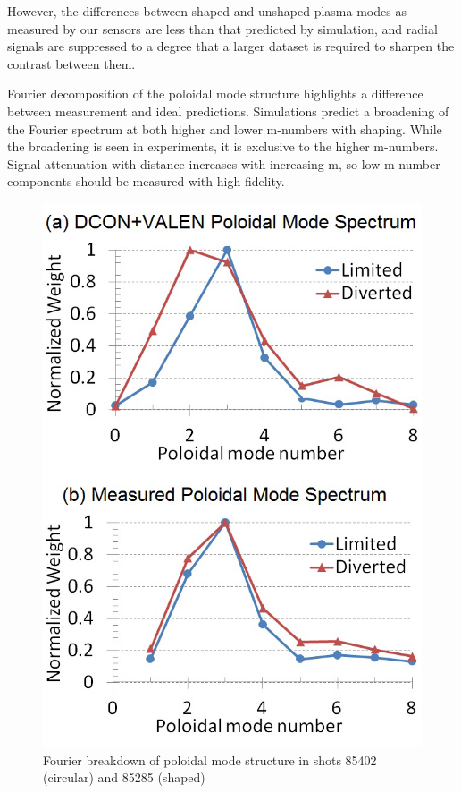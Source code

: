 \documentclass[aps,prl,twocolumn,superscriptaddress,groupedaddress]{revtex4}  %
\begin{document}
However, the differences between shaped and unshaped plasma modes as measured by our sensors are less than that predicted by simulation, and radial signals are suppressed to a degree that a larger dataset is required to sharpen the contrast between them.\par
	Fourier decomposition of the poloidal mode structure highlights a difference between measurement and ideal predictions.  Simulations predict a broadening of the Fourier spectrum at both higher and lower m-numbers with shaping.  While the broadening is seen in experiments, it is exclusive to the higher m-numbers.  Signal attenuation with distance increases with increasing m, so low m number components should be measured with high fidelity.\par
	\begin{figure}[htb]
	\centering
\includegraphics[scale=.5]{../Plots/fig2_mode_spectrum_REV2.png}\caption{Fourier breakdown of poloidal mode structure in shots 85402 (circular) and 85285 (shaped)}
	\label{mike_mode_structure}
	\end{figure}
\end{document}
